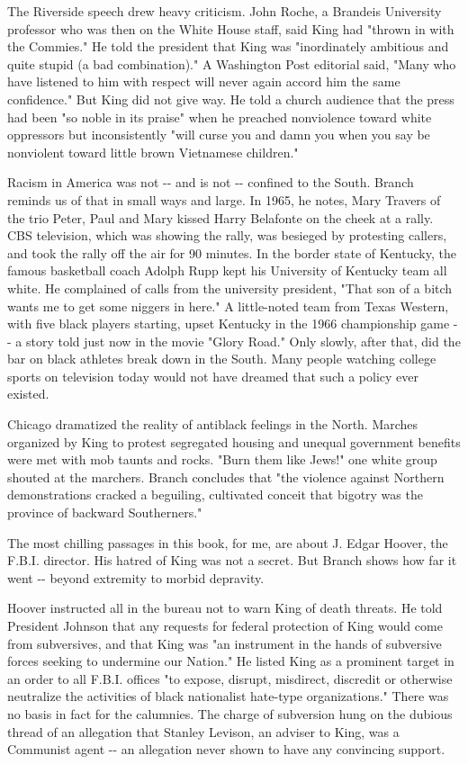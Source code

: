 The Riverside speech drew heavy criticism. John Roche, a Brandeis
University professor who was then on the White House staff, said King
had "thrown in with the Commies." He told the president that King was
"inordinately ambitious and quite stupid (a bad combination)." A
Washington Post editorial said, "Many who have listened to him with
respect will never again accord him the same confidence." But King did
not give way. He told a church audience that the press had been "so
noble in its praise" when he preached nonviolence toward white
oppressors but inconsistently "will curse you and damn you when you say
be nonviolent toward little brown Vietnamese children."

Racism in America was not -\/- and is not -\/- confined to the South.
Branch reminds us of that in small ways and large. In 1965, he notes,
Mary Travers of the trio Peter, Paul and Mary kissed Harry Belafonte on
the cheek at a rally. CBS television, which was showing the rally, was
besieged by protesting callers, and took the rally off the air for 90
minutes. In the border state of Kentucky, the famous basketball coach
Adolph Rupp kept his University of Kentucky team all white. He
complained of calls from the university president, "That son of a bitch
wants me to get some niggers in here." A little-noted team from Texas
Western, with five black players starting, upset Kentucky in the 1966
championship game -\/- a story told just now in the movie "Glory Road."
Only slowly, after that, did the bar on black athletes break down in the
South. Many people watching college sports on television today would not
have dreamed that such a policy ever existed.

Chicago dramatized the reality of antiblack feelings in the North.
Marches organized by King to protest segregated housing and unequal
government benefits were met with mob taunts and rocks. "Burn them like
Jews!" one white group shouted at the marchers. Branch concludes that
"the violence against Northern demonstrations cracked a beguiling,
cultivated conceit that bigotry was the province of backward
Southerners."

The most chilling passages in this book, for me, are about J. Edgar
Hoover, the F.B.I. director. His hatred of King was not a secret. But
Branch shows how far it went -\/- beyond extremity to morbid depravity.

Hoover instructed all in the bureau not to warn King of death threats.
He told President Johnson that any requests for federal protection of
King would come from subversives, and that King was "an instrument in
the hands of subversive forces seeking to undermine our Nation." He
listed King as a prominent target in an order to all F.B.I. offices "to
expose, disrupt, misdirect, discredit or otherwise neutralize the
activities of black nationalist hate-type organizations." There was no
basis in fact for the calumnies. The charge of subversion hung on the
dubious thread of an allegation that Stanley Levison, an adviser to
King, was a Communist agent -\/- an allegation never shown to have any
convincing support.

